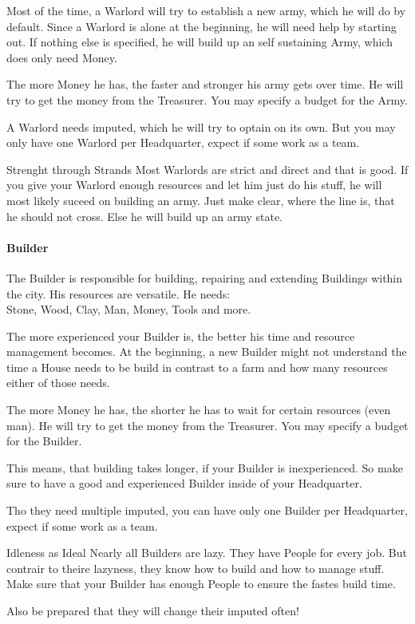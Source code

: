 \documentclass[10pt,twoside,twocolumn,openany]{book}
\begin{document}
Most of the time, a Warlord will try to establish a new army, which he will do by default. Since a Warlord is alone at the beginning, he will need help by starting out. If nothing else is specified, he will build up an self sustaining Army, which does only need Money.

The more Money he has, the faster and stronger his army gets over time. He will try to get the money from the Treasurer. You may specify a budget for the Army.

A Warlord needs imputed, which he will try to optain on its own. But you may only have one Warlord per Headquarter, expect if some work as a team.

\begin{paperbox}{Strenght through Strands}
Most Warlords are strict and direct and that is good. If you give your Warlord enough resources and let him just do his stuff, he will most likely suceed on building an army. Just make clear, where the line is, that he should not cross. Else he will build up an army state.
\end{paperbox}

\paragraph{Builder}

The Builder is responsible for building, repairing and extending Buildings within the city. His resources are versatile. He needs:\\
Stone, Wood, Clay, Man, Money, Tools and more.

The more experienced your Builder is, the better his time and resource management becomes. At the beginning, a new Builder might not understand the time a House needs to be build in contrast to a farm and how many resources either of those needs.

The more Money he has, the shorter he has to wait for certain resources (even man). He will try to get the money from the Treasurer. You may specify a budget for the Builder.

This means, that building takes longer, if your Builder is inexperienced. So make sure to have a good and experienced Builder inside of your Headquarter.

Tho they need multiple imputed, you can have only one Builder per Headquarter, expect if some work as a team.

\begin{paperbox}{Idleness as Ideal}
Nearly all Builders are lazy. They have People for every job. But contrair to theire lazyness, they know how to build and how to manage stuff. Make sure that your Builder has enough People to ensure the fastes build time.

Also be prepared that they will change their imputed often!
\end{paperbox}
\end{document}

